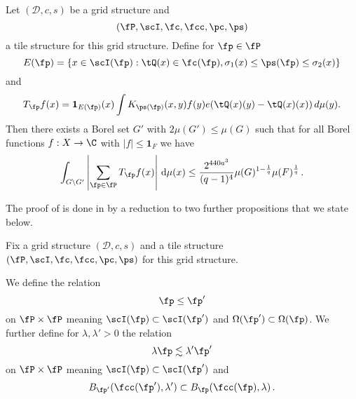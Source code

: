 \begin{proposition}
\label{discrete-Carleson}
\leanok
{}
Let $(\mathcal{D}, c, s)$ be a grid structure and \begin{equation*}
    (\fP,\scI,\fc,\fcc,\pc,\ps)
\end{equation*}
a tile structure for this grid structure.
Define for $\fp\in \fP$
\begin{equation}\label{defineep}
    E(\fp)=\{x\in \scI(\fp): \tQ(x)\in \fc(\fp) , {\sigma_1}(x)\le \ps(\fp)\le {\sigma_2}(x)\}
\end{equation}
and
\begin{equation}\label{definetp}
    T_{\fp} f(x)= \mathbf{1}_{E(\fp)}(x) \int K_{\ps(\fp)}(x,y) f(y) e(\tQ(x)(y)-\tQ(x)(x))\, d\mu(y).
\end{equation}
Then there exists a Borel set $G'$ with $2\mu(G') \leq \mu(G)$ such that for all Borel functions $f:X\to \C$ with $|f|\le \mathbf{1}_F$
we have
\begin{equation}
    \label{disclesssim}
   \int_{G \setminus G'} \left| \sum_{\fp \in \fP} T_{\fp} f (x) \right| \, \mathrm{d}\mu(x) \le \frac{2^{440a^3}}{(q-1)^4} \mu(G)^{1-\frac{1}{q}} \mu(F)^{\frac{1}{q}}\,.
\end{equation}
\end{proposition}









The proof of  is done in 
by a reduction to two further propositions that we state below.


Fix a grid structure $(\mathcal{D}, c, s)$ and a tile structure $(\fP,\scI,\fc,\fcc,\pc,\ps)$
for this grid structure.

We define the relation
\begin{equation}\label{straightorder}
    \fp\le \fp'
\end{equation}
 on $\fP\times \fP$ meaning
$\scI(\fp)\subset \scI(\fp')$ and
$\Omega(\fp')\subset \Omega(\fp)$.
We further define for $\lambda,\lambda' >0$
the relation
\begin{equation}\label{wiggleorder}
    \lambda \fp \lesssim \lambda' \fp'
\end{equation}
on $\fP\times \fP$ meaning
$\scI(\fp)\subset \scI(\fp')$ and
\begin{equation}
    B_{\fp'}(\fcc(\fp'),\lambda' )
    \subset B_{\fp}(\fcc(\fp),\lambda )\, .
\end{equation}



